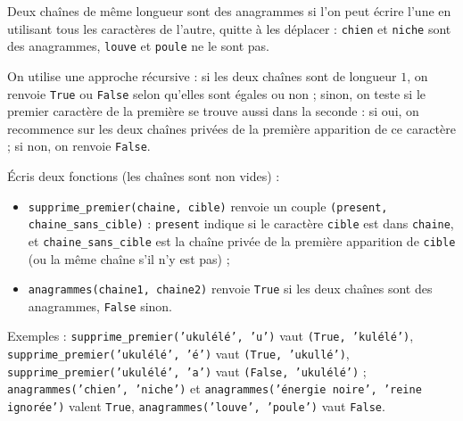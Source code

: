 Deux chaînes de même longueur sont des anagrammes si l'on peut écrire l'une en utilisant tous les caractères de l'autre, quitte à les déplacer : \texttt{chien} et \texttt{niche} sont des anagrammes, \texttt{louve} et \texttt{poule} ne le sont pas.

On utilise une approche récursive : si les deux chaînes sont de longueur $1$, on renvoie \texttt{True} ou \texttt{False} selon qu'elles sont égales ou non ; sinon, on teste si le premier caractère de la première se trouve aussi dans la seconde : si oui, on recommence sur les deux chaînes privées de la première apparition de ce caractère ; si non, on renvoie \texttt{False}.

Écris deux fonctions (les chaînes sont non vides) :
\begin{itemize}
\item \texttt{supprime\_premier(chaine, cible)} renvoie un couple \texttt{(present, chaine\_sans\_cible)} : \texttt{present} indique si le caractère \texttt{cible} est dans \texttt{chaine}, et \texttt{chaine\_sans\_cible} est la chaîne privée de la première apparition de \texttt{cible} (ou la même chaîne s'il n'y est pas) ;
\item \texttt{anagrammes(chaine1, chaine2)} renvoie \texttt{True} si les deux chaînes sont des anagrammes, \texttt{False} sinon.
\end{itemize}
Exemples : \texttt{supprime\_premier('ukulélé', 'u')} vaut \texttt{(True, 'kulélé')}, \texttt{supprime\_premier('ukulélé', 'é')} vaut \texttt{(True, 'ukullé')}, \texttt{supprime\_premier('ukulélé', 'a')} vaut \texttt{(False, 'ukulélé')} ; \texttt{anagrammes('chien', 'niche')} et \texttt{anagrammes('énergie noire', 'reine ignorée')} valent \texttt{True}, \texttt{anagrammes('louve', 'poule')} vaut \texttt{False}.
